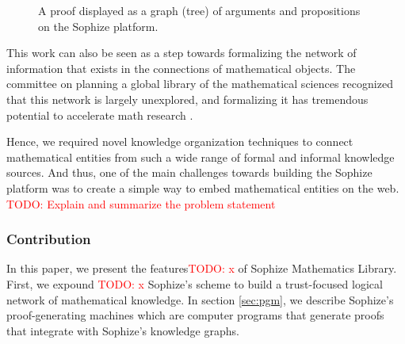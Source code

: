 \documentclass[a4paper]{article}
\newcommand\todo[1]{\textcolor{red}{TODO: #1}}
\begin{document}
\begin{figure}[htbp]
\begin{center}
\caption{A proof displayed as a graph (tree) of arguments and propositions on the Sophize platform.}
\label{proof_tree}
\end{center}
\end{figure}

This work can also be seen as a step towards formalizing the network of information that exists in the connections of mathematical objects. The committee on planning a global library of the mathematical sciences recognized that this network is largely unexplored, and formalizing it has tremendous potential to accelerate math research \cite{sciences2014developing}.

Hence, we required novel knowledge organization techniques to connect mathematical entities from such a wide range of formal and informal knowledge sources. And thus, one of the main challenges towards building the Sophize platform was to create a simple way to embed mathematical entities on the web. \todo{Explain and summarize the problem statement}


\subsubsection*{Contribution}
In this paper, we present the features\todo{x} of Sophize Mathematics Library. First, we expound \todo{x} Sophize's scheme to build a trust-focused logical network of mathematical knowledge. In section \ref{sec:pgm}, we describe Sophize's proof-generating machines which are computer programs that generate proofs that integrate with Sophize's knowledge graphs.
\end{document}
